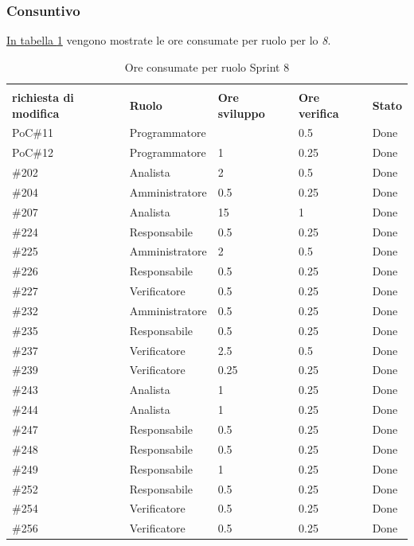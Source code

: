 \subsubsection{Consuntivo}
\hyperref[tab:sprint8_ore_consumate]{In tabella \ref{tab:sprint8_ore_consumate}} vengono mostrate le ore consumate per ruolo per lo \textit{ 8}.

\begin{table}[H]
    \centering
    \begin{tabular}{| l | l | l | l | l |}
        \hline
            \makecell{\textbf{Identificativo} \\ \textbf{richiesta di modifica}} &
            \textbf{Ruolo} &
            \textbf{Ore sviluppo} &
            \textbf{Ore verifica} &
            \textbf{Stato}\\
        \hline
        PoC\#11 & Programmatore &  & 0.5 & Done\\
        \hline
        PoC\#12 & Programmatore & 1 & 0.25 & Done\\
        \hline
        \#202 & Analista & 2 & 0.5 & Done\\
        \hline
        \#204 & Amministratore & 0.5 & 0.25 & Done\\
        \hline
        \#207 & Analista & 15 & 1 & Done\\
        \hline
        \#224 & Responsabile & 0.5 & 0.25 &  Done\\
        \hline
        \#225 & Amministratore & 2 & 0.5 & Done\\
        \hline
        \#226 & Responsabile & 0.5 & 0.25 & Done\\
        \hline
        \#227 & Verificatore & 0.5 & 0.25 & Done\\
        \hline
        \#232 & Amministratore & 0.5 & 0.25 & Done\\
        \hline
        \#235 & Responsabile & 0.5 & 0.25 & Done\\
        \hline
        \#237 & Verificatore & 2.5 & 0.5 & Done\\
        \hline
        \#239 & Verificatore & 0.25 & 0.25 & Done\\
        \hline
        \#243 & Analista & 1 & 0.25 & Done\\
        \hline
        \#244 & Analista & 1 & 0.25 & Done\\
        \hline
        \#247 & Responsabile & 0.5 & 0.25 & Done\\
        \hline
        \#248 & Responsabile & 0.5 & 0.25 & Done\\
        \hline
        \#249 & Responsabile & 1 & 0.25 & Done\\
        \hline
        \#252 & Responsabile & 0.5 & 0.25 & Done\\
        \hline
        \#254 & Verificatore & 0.5 & 0.25 & Done\\
        \hline
        \#256 & Verificatore & 0.5 & 0.25 & Done\\
        \hline
    \end{tabular}
    \caption{Ore consumate per ruolo Sprint 8}
    \label{tab:sprint8_ore_consumate} 
\end{table}